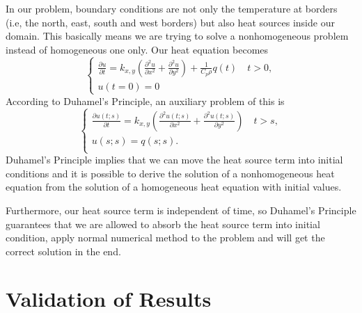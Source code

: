 \documentclass[10pt,a4paper]{report}
\begin{document}
In our problem, boundary conditions are not only the temperature at borders (i.e, the north, east, south and west borders) but also heat sources inside our domain. This basically means we are trying to solve a nonhomogeneous problem instead of homogeneous one only. Our heat equation becomes
\begin{equation}
\begin{cases}
 {\frac{\partial u}{\partial t}}=k_{x,y} ({\frac{\partial^2 u}{\partial x^2}}+{\frac{\partial^2 u}{\partial y^2}})+{\frac{1}{C_p \rho}}q(t) \quad t>0,\\
 u(t=0)=0
\end{cases}
\end{equation}
According to Duhamel's Principle, an auxiliary problem of this is   
\begin{equation}
\begin{cases}
 {\frac{\partial u(t;s)}{\partial t}}=k_{x,y} ({\frac{\partial^2 u(t;s)}{\partial x^2}}+{\frac{\partial^2 u(t;s)}{\partial y^2}}) \quad t>s,\\
 u(s;s)=q(s;s).\\
\end{cases}  
\end{equation}
Duhamel's Principle implies that we can move the heat source term into initial conditions and it is possible to derive the solution of a nonhomogeneous heat equation from the solution of a homogeneous heat equation with initial values.

Furthermore, our heat source term is independent of time, so Duhamel's Principle guarantees that we are allowed to absorb the heat source term into initial condition, apply normal numerical method to the problem and will get the correct solution in the end.

\section{Validation of Results}
\end{document}
